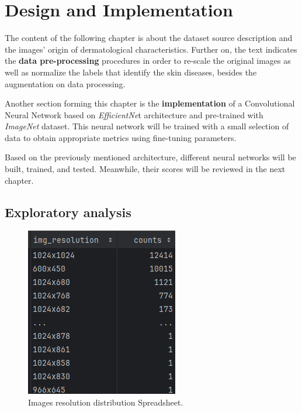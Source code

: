 \chapter{Design and Implementation}
\label{chapter: Design and implementation}
The content of the following chapter is about the dataset source description and the images' origin of dermatological characteristics. Further on, the text indicates the \textbf{data pre-processing} procedures in order to re-scale the original images as well as normalize the labels that identify the skin diseases,  besides the augmentation on data processing. 

Another section forming this chapter is the\textbf{ implementation} of a Convolutional Neural Network based on \textit{EfficientNe}t architecture and pre-trained with \textit{ImageNet} dataset. This neural network will be trained with a small selection of data to obtain appropriate metrics using fine-tuning parameters.

Based on the previously mentioned architecture, different neural networks will be built, trained, and tested. Meanwhile, their scores will be reviewed in the next chapter. 


\section{Exploratory analysis}

\begin{figure} 
    \vspace{-20pt}
    \centering
        \includegraphics[scale=0.75 ]{images/Building/resolution_list.png}
        \caption{Images resolution distribution Spreadsheet.}
    \label{fig:Spreadsheet_resolution_images}
    \vspace{-100pt}
\end{figure}

